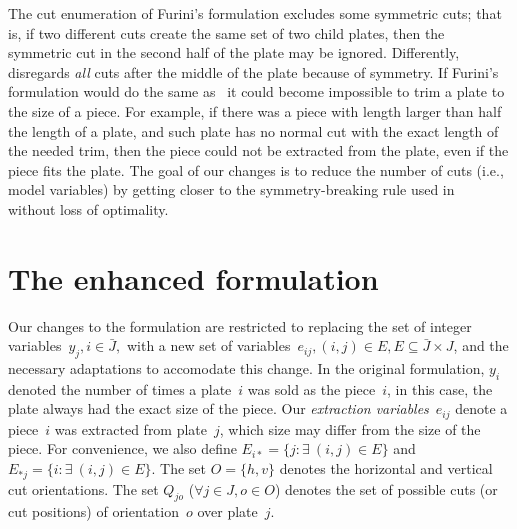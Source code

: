 \documentclass[ppgc,prop-tese,english,formais,babel]{iiufrgs}
\begin{document}
The cut enumeration of Furini's formulation excludes some symmetric cuts; that is, if two different cuts create the same set of two child plates, then the symmetric cut in the second half of the plate may be ignored.
Differently,~\citet{cw:1977} disregards \emph{all} cuts after the middle of the plate because of symmetry.
If Furini's formulation would do the same as~\citet{cw:1977} it could become impossible to trim a plate to the size of a piece.
For example, if there was a piece with length larger than half the length of a plate, and such plate has no normal cut with the exact length of the needed trim, then the piece could not be extracted from the plate, even if the piece fits the plate.
The goal of our changes is to reduce the number of cuts (i.e., model variables) by getting closer to the symmetry-breaking rule used in~\citet{cw:1977} without loss of optimality.


\section{The enhanced formulation}
\label{sec:enhanced}

Our changes to the formulation are restricted to replacing the set of integer variables~\(y_j, i \in \bar{J},\) with a new set of variables~\(e_{ij}, (i, j) \in E, E \subseteq \bar{J} \times J\), and the necessary adaptations to accomodate this change.
In the original formulation, \(y_i\) denoted the number of times a plate~\(i\) was sold as the piece~\(i\), in this case, the plate always had the exact size of the piece.
Our \emph{extraction variables}~\(e_{ij}\) denote a piece~\(i\) was extracted from plate~\(j\), which size may differ from the size of the piece.
For convenience, we also define \(E_{i*} = \{ j : \exists~(i, j) \in E \}\) and \(E_{*j} = \{i : \exists~(i, j) \in E \}\).
The set \(O = \{h, v\}\) denotes the horizontal and vertical cut orientations.
The set \(Q_{jo}\) (\(\forall j \in J, o \in O\)) denotes the set of possible cuts (or cut positions) of orientation~\(o\) over plate~\(j\).
\end{document}
